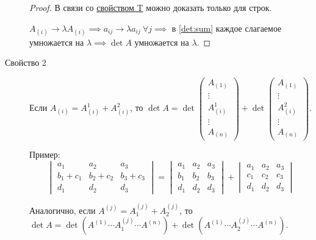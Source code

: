 \begin{description}
    \begin{proof}
        В связи со \hyperref[det:prop_t]{свойством T} можно доказать только для строк.

        $A_{(i)} \to \lambda A_{(i)} \implies a_{ij} \to \lambda a_{ij} \ \forall j \implies $ в \eqref{det:sum} каждое слагаемое умножается на $\lambda \implies \det A$ умножается на $\lambda$.
    \end{proof}

\item[Свойство 2\label{det:prop_2}]
    Если $A_{(i)} = A_{(i)}^1 + A_{(i)}^2$, то $\det A = \det \begin{pmatrix}
        A_{(1)} \\ \vdots \\ A_{(i)}^1 \\ \vdots \\ A_{(n)}
    \end{pmatrix} + \det \begin{pmatrix}
        A_{(1)} \\ \vdots \\ A_{(i)}^2 \\ \vdots \\ A_{(n)}
    \end{pmatrix}$.

    \bigskip
    Пример:
    \begin{equation*}
        \begin{vmatrix}
            a_1 & a_2 & a_3 \\
            b_1 + c_1 & b_2 + c_2 & b_3 + c_3 \\
            d_1 & d_2 & d_3
        \end{vmatrix} = \begin{vmatrix}
            a_1 & a_2 & a_3 \\
            b_1 & b_2 & b_3 \\
            d_1 & d_2 & d_3
        \end{vmatrix} + \begin{vmatrix}
            a_1 & a_2 & a_3 \\
            c_1 & c_2 & c_3 \\
            d_1 & d_2 & d_3
        \end{vmatrix}
    \end{equation*}

    Аналогично, если $A^{(j)} = A^{(j)}_1 + A^{(j)}_2$, то $\det A = \det (A^{(1)} \cdots A^{(j)}_1 \cdots A^{(n)}) + \det (A^{(1)} \cdots A^{(j)}_2 \cdots A^{(n)})$.


\end{description}
